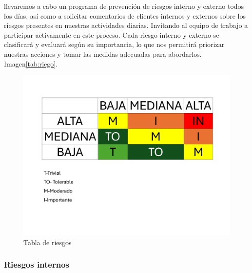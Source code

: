     llevaremos a cabo un programa de prevención de riesgos interno y externo todos los días, así como a solicitar comentarios de clientes internos y externos sobre los riesgos presentes en nuestras actividades diarias. Invitando al equipo de trabajo a participar activamente en este proceso.
    Cada riesgo interno y externo se clasificará y evaluará según su importancia, lo que nos permitirá priorizar nuestras acciones y tomar las medidas adecuadas para abordarlos. Imagen\ref{tab:riego}.
    \begin{figure}[H]
        \centering
        \includegraphics[scale=0.3]{13/img/EvaluacionRiesgo.pdf}
        \caption{Tabla de riesgos}
    \end{figure}
    \subsubsection{Riesgos internos}
    
